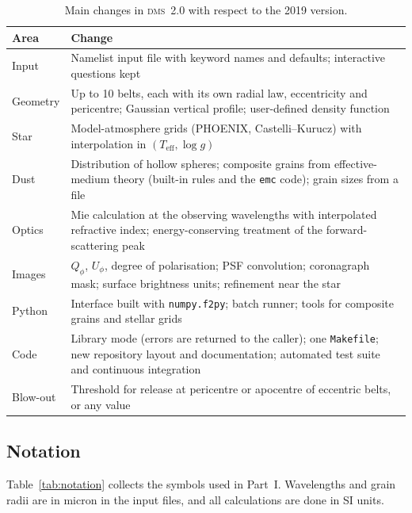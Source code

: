\documentclass[11pt,a4paper]{article}
\newcommand{\dms}{\textsc{dms}}
\newcommand{\code}[1]{\texttt{#1}}
\begin{document}
\begin{table}[h]
\centering
\caption{Main changes in \dms\ 2.0 with respect to the 2019 version.}
\label{tab:new}
\small
\begin{tabularx}{\textwidth}{@{}lX@{}}
\toprule
Area & Change \\
\midrule
Input & Namelist input file with keyword names and defaults; interactive questions kept \\
Geometry & Up to 10 belts, each with its own radial law, eccentricity and pericentre;
           Gaussian vertical profile; user-defined density function \\
Star & Model-atmosphere grids (PHOENIX, Castelli--Kurucz) with interpolation in
       $(T_\mathrm{eff},\log g)$ \\
Dust & Distribution of hollow spheres; composite grains from effective-medium theory (built-in
       rules and the \code{emc} code); grain sizes from a file \\
Optics & Mie calculation at the observing wavelengths with interpolated refractive index;
         energy-conserving treatment of the forward-scattering peak \\
Images & $Q_\phi$, $U_\phi$, degree of polarisation; PSF convolution; coronagraph mask; surface
         brightness units; refinement near the star \\
Python & Interface built with \code{numpy.f2py}; batch runner; tools for composite grains and
         stellar grids \\
Code & Library mode (errors are returned to the caller); one \code{Makefile}; new repository
       layout and documentation; automated test suite and continuous integration \\
Blow-out & Threshold for release at pericentre or apocentre of eccentric belts, or any value \\
\bottomrule
\end{tabularx}
\end{table}

\subsection{Notation}

Table~\ref{tab:notation} collects the symbols used in Part~I. Wavelengths and grain radii are in
micron in the input files, and all calculations are done in SI units.
\end{document}

